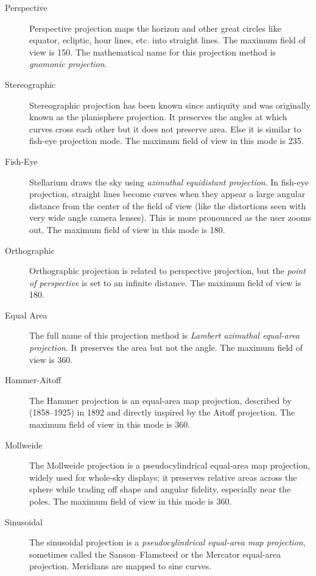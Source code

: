 \begin{description}
  \item[Perspective] Perspective projection maps the horizon and other
    great circles like equator, ecliptic, hour lines, etc. into
    straight lines. The maximum field of view is 150\degree. The
    mathematical name for this projection method is \emph{gnomonic
      projection}.
  \item[Stereographic] Stereographic projection has been known since
    antiquity and was originally known as the planisphere
    projection. It preserves the angles at which curves cross each
    other but it does not preserve area. Else it is similar to
    fish-eye projection mode. The maximum field of view in this mode
    is 235\degree.
  \item[Fish-Eye] Stellarium draws the sky using \emph{azimuthal
    equidistant projection}. In fish-eye projection, straight lines
    become curves when they appear a large angular distance from the
    center of the field of view (like the distortions seen with very
    wide angle camera lenses). This is more pronounced as the user zooms
    out. The maximum field of view in this mode is 180\degree.
  \item[Orthographic] Orthographic projection is related to
    perspective projection, but the \emph{point of perspective} is set
    to an infinite distance. The maximum field of view is 180\degree.
  \item[Equal Area] The full name of this projection method is
    \emph{Lambert azimuthal equal-area projection}. It preserves the
    area but not the angle. The maximum field of view is 360\degree.
  \item[Hammer-Aitoff] The Hammer projection is an equal-area map
    projection, described by  (1858--1925) in 1892 and directly inspired
    by the Aitoff projection. The maximum field of view in this mode is
    360\degree.
  \item[Mollweide] The Mollweide projection is a pseudocylindrical equal‑area map projection,
    widely used for whole‑sky displays; it preserves relative areas across the sphere while
    trading off shape and angular fidelity, especially near the poles.
    The maximum field of view in this mode is 360\degree.
  \item[Sinusoidal] The sinusoidal projection is a
    \emph{pseudocylindrical equal-area map projection}, sometimes
    called the Sanson--Flamsteed or the Mercator equal-area
    projection. Meridians are mapped to sine curves.

\end{description}
